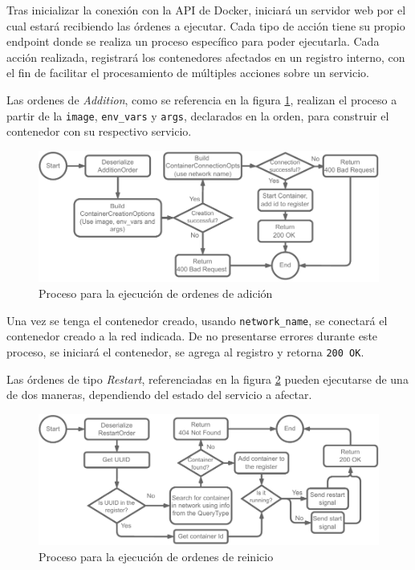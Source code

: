 Tras inicializar la conexión con la API de Docker, iniciará un servidor web por el cual estará recibiendo las órdenes a ejecutar. Cada tipo de acción tiene su propio endpoint donde se realiza un proceso específico para poder ejecutarla. Cada acción realizada, registrará los contenedores afectados en un registro interno, con el fin de facilitar el procesamiento de múltiples acciones sobre un servicio. 

Las ordenes de \textit{Addition}, como se referencia en la figura \ref{fig:DoThingAddition}, realizan el proceso a partir de la \texttt{image}, \texttt{env\_vars} y \texttt{args}, declarados en la orden, para construir el contenedor con su respectivo servicio.

\begin{figure}[ht]
    \centering
    \caption{Proceso para la ejecución de ordenes de adición}
    \label{fig:DoThingAddition}
    \includegraphics[width=0.8\linewidth]{images/DoThingAddition.pdf}
\end{figure}

Una vez se tenga el contenedor creado, usando \texttt{network\_name}, se conectará el contenedor creado a la red indicada. De no presentarse errores durante este proceso, se iniciará el contenedor, se agrega al registro y retorna \texttt{200 OK}. 

Las órdenes de tipo \textit{Restart}, referenciadas en la figura \ref{fig:DoThingRestart} pueden ejecutarse de una de dos maneras, dependiendo del estado del servicio a afectar. 

\begin{figure}[ht]
    \centering
    \caption{Proceso para la ejecución de ordenes de reinicio}
    \label{fig:DoThingRestart}
    \includegraphics[width=0.9\linewidth]{images/DoThingRestart.pdf}
\end{figure}

